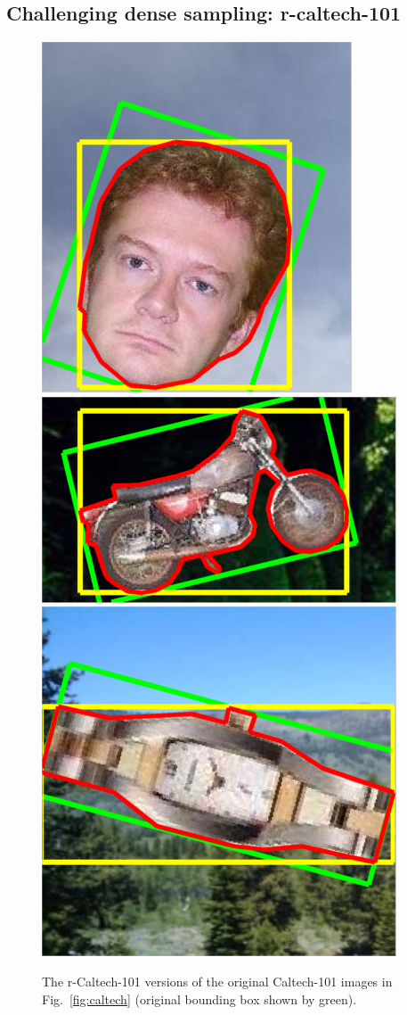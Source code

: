 \documentclass[journal]{IEEEtran}
\begin{document}
%
\subsection{Challenging dense sampling: r-caltech-101\label{sec:challenging}}
%
\begin{figure}[h]
\begin{center}
  \includegraphics[width=0.25\linewidth]{resources/r-caltech-101_face_example.png}
  \includegraphics[width=0.4\linewidth]{resources/r-caltech-101_motorbikes_example.png}
  \includegraphics[width=0.25\linewidth]{resources/r-caltech-101_watch_example.png}
  \caption{The r-Caltech-101 versions of the original Caltech-101 images in Fig.~\ref{fig:caltech}
    (original bounding box shown by green).\label{fig:rcaltech}}
  \end{center}
\end{figure}
%
%
\end{document}
